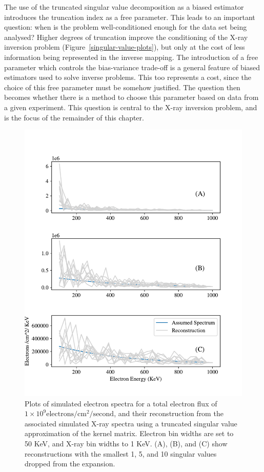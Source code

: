 The use of the truncated singular value decomposition as a biased estimator introduces the truncation index as a free parameter. This leads to an important question: when is the problem well-conditioned enough for the data set being analysed? Higher degrees of truncation improve the conditioning of the X-ray inversion problem (Figure~\ref{singular-value-plots}), but only at the cost of less information being represented in the inverse mapping. The introduction of a free parameter which controls the bias-variance trade-off is a general feature of biased estimators used to solve inverse problems. This too represents a cost, since the choice of this free parameter must be somehow justified. The question then becomes whether there is a method to choose this parameter based on data from a given experiment. This question is central to the X-ray inversion problem, and is the focus of the remainder of this chapter. 

\begin{figure}[p]
    \centering
    \includegraphics[width=.95\textwidth]{figures/chapter_4/tsvd_test/tsvd_test_2.pdf}
    \caption{Plots of simulated electron spectra for a total electron flux of $1\times10^9 \mbox{electrons} / \mbox{cm}^2 / \mbox{second}$, and their reconstruction from the associated simulated X-ray spectra using a truncated singular value approximation of the kernel matrix. Electron bin widths are set to 50 KeV, and X-ray bin widths to 1 KeV. (A), (B), and (C) show reconstructions with the smallest 1, 5, and 10 singular values dropped from the expansion.}
    \label{tsvd_test}
\end{figure}

